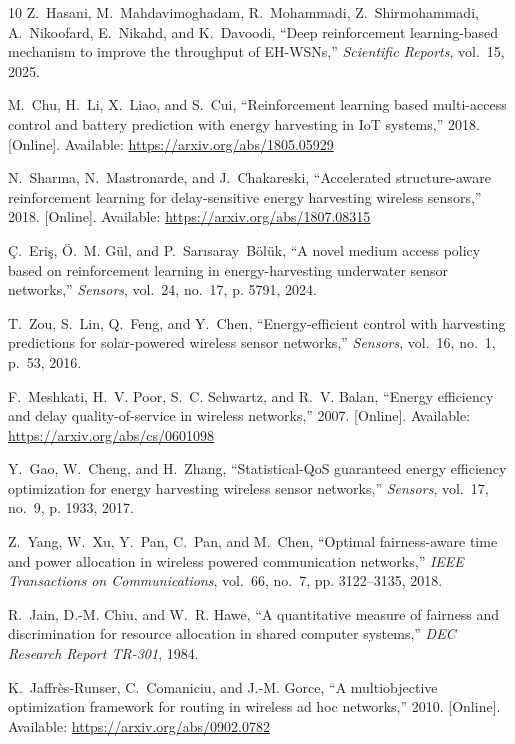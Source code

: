 \documentclass[journal]{IEEEtran}
\begin{document}
\begin{thebibliography}{10}
Z.~Hasani, M.~Mahdavimoghadam, R.~Mohammadi, Z.~Shirmohammadi, A.~Nikoofard,
  E.~Nikahd, and K.~Davoodi, ``Deep reinforcement learning-based mechanism to
  improve the throughput of EH-WSNs,'' \emph{Scientific Reports}, vol.~15,
  2025.

M.~Chu, H.~Li, X.~Liao, and S.~Cui, ``Reinforcement learning based multi-access
  control and battery prediction with energy harvesting in IoT systems,'' 2018.
  [Online]. Available: \url{https://arxiv.org/abs/1805.05929}

N.~Sharma, N.~Mastronarde, and J.~Chakareski, ``Accelerated structure-aware
  reinforcement learning for delay-sensitive energy harvesting wireless
  sensors,'' 2018. [Online]. Available: \url{https://arxiv.org/abs/1807.08315}

{\c{C}}.~Eri{\c{s}}, {\"O}.~M. G{\"u}l, and P.~Sar{\i}saray~B{\"o}l{\"u}k, ``A
  novel medium access policy based on reinforcement learning in
  energy-harvesting underwater sensor networks,'' \emph{Sensors}, vol.~24,
  no.~17, p. 5791, 2024.

T.~Zou, S.~Lin, Q.~Feng, and Y.~Chen, ``Energy-efficient control with
  harvesting predictions for solar-powered wireless sensor networks,''
  \emph{Sensors}, vol.~16, no.~1, p.~53, 2016.

F.~Meshkati, H.~V. Poor, S.~C. Schwartz, and R.~V. Balan, ``Energy efficiency
  and delay quality-of-service in wireless networks,'' 2007. [Online].
  Available: \url{https://arxiv.org/abs/cs/0601098}

Y.~Gao, W.~Cheng, and H.~Zhang, ``Statistical-QoS guaranteed energy efficiency
  optimization for energy harvesting wireless sensor networks,''
  \emph{Sensors}, vol.~17, no.~9, p. 1933, 2017.

Z.~Yang, W.~Xu, Y.~Pan, C.~Pan, and M.~Chen, ``Optimal fairness-aware time and
  power allocation in wireless powered communication networks,'' \emph{IEEE
  Transactions on Communications}, vol.~66, no.~7, pp. 3122--3135, 2018.

R.~Jain, D.-M. Chiu, and W.~R. Hawe, ``A quantitative measure of fairness and
  discrimination for resource allocation in shared computer systems,''
  \emph{DEC Research Report TR-301}, 1984.

K.~Jaffr{\`e}s-Runser, C.~Comaniciu, and J.-M. Gorce, ``A multiobjective
  optimization framework for routing in wireless ad hoc networks,'' 2010.
  [Online]. Available: \url{https://arxiv.org/abs/0902.0782}


\end{thebibliography}
\end{document}

